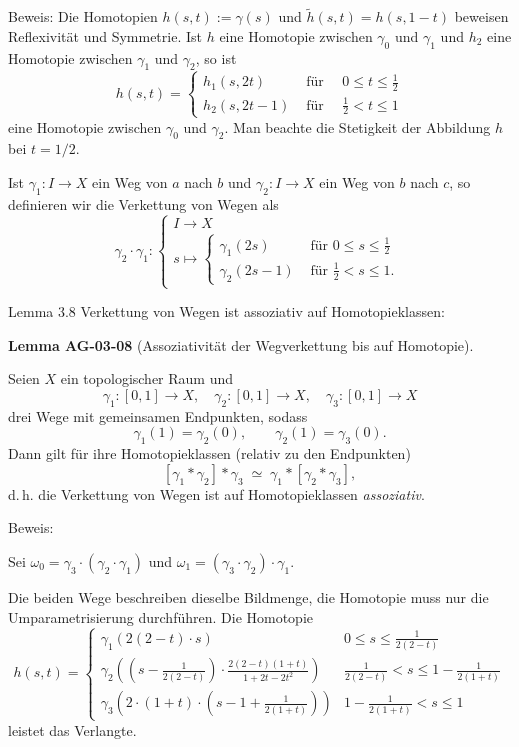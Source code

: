 \documentclass[10pt, letterpaper]{article}
\newcommand{\CustomHeading}[3]{%
  \par\medskip\noindent%
  \textbf{#1 #2} \textnormal{(#3)}.\enskip%
}
\newenvironment{LEM}[2]{\begin{unitbox}\CustomHeading{Lemma}{#1}{#2}}{\end{unitbox}}
\begin{document}
Beweis: Die Homotopien $h(s, t):=\gamma(s)$ und $\widetilde{h}(s, t)=h(s, 1-t)$ beweisen Reflexivität und Symmetrie. Ist $h$ eine Homotopie zwischen $\gamma_{0}$ und $\gamma_{1}$ und $h_{2}$ eine Homotopie zwischen $\gamma_{1}$ und $\gamma_{2}$, so ist
$$
h(s, t)= \begin{cases}h_{1}(s, 2 t) & \text { für } \quad 0 \leq t \leq \frac{1}{2} \\ h_{2}(s, 2 t-1) & \text { für } \quad \frac{1}{2}<t \leq 1\end{cases}
$$
eine Homotopie zwischen $\gamma_{0}$ und $\gamma_{2}$. Man beachte die Stetigkeit der Abbildung $h$ bei $t=1 / 2$. 



Ist $\gamma_{1}: I \rightarrow X$ ein Weg von $a$ nach $b$ und $\gamma_{2}: I \rightarrow X$ ein Weg von $b$ nach $c$, so definieren wir die Verkettung von Wegen als
$$
\gamma_{2} \cdot \gamma_{1}:\left\{\begin{array}{l}
I \longrightarrow X \\
s \longmapsto \begin{cases}\gamma_{1}(2 s) & \text { für } 0 \leq s \leq \frac{1}{2} \\
\gamma_{2}(2 s-1) & \text { für } \frac{1}{2}<s \leq 1 .\end{cases}
\end{array}\right.
$$



Lemma 3.8 Verkettung von Wegen ist assoziativ auf Homotopieklassen:

\begin{LEM}{AG-03-08}{Assoziativität der Wegverkettung bis auf Homotopie}
Seien \(X\) ein topologischer Raum und 
\[
\gamma_1:[0,1]\to X,\quad \gamma_2:[0,1]\to X,\quad \gamma_3:[0,1]\to X
\]
drei Wege mit gemeinsamen Endpunkten, sodass
\[
\gamma_1(1)=\gamma_2(0), \qquad \gamma_2(1)=\gamma_3(0).
\]
Dann gilt für ihre Homotopieklassen (relativ zu den Endpunkten)
\[
[\gamma_1 * \gamma_2] * \gamma_3 \;\simeq\; \gamma_1 * [\gamma_2 * \gamma_3],
\]
d.\,h. die Verkettung von Wegen ist auf Homotopieklassen \emph{assoziativ}.
\end{LEM}


Beweis: 

Sei $\omega_{0}=\gamma_{3} \cdot\left(\gamma_{2} \cdot \gamma_{1}\right)$ und $\omega_{1}=\left(\gamma_{3} \cdot \gamma_{2}\right) \cdot \gamma_{1}$.

Die beiden Wege beschreiben dieselbe Bildmenge, die Homotopie muss nur die Umparametrisierung durchführen. Die Homotopie
$$
h(s, t)= \begin{cases}\gamma_{1}(2(2-t) \cdot s) & 0 \leq s \leq \frac{1}{2(2-t)} \\ \gamma_{2}\left(\left(s-\frac{1}{2(2-t)}\right) \cdot \frac{2(2-t)(1+t)}{1+2 t-2 t^{2}}\right) & \frac{1}{2(2-t)}<s \leq 1-\frac{1}{2(1+t)} \\ \gamma_{3}\left(2 \cdot(1+t) \cdot\left(s-1+\frac{1}{2(1+t)}\right)\right) & 1-\frac{1}{2(1+t)}<s \leq 1\end{cases}
$$
leistet das Verlangte.
\end{document}
